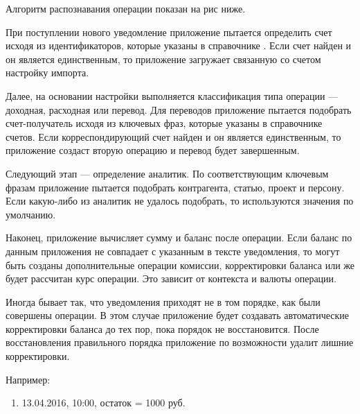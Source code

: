 \documentclass[a4paper,10pt,russian]{sphinxmanual}
\begin{document}
Алгоритм распознавания операции показан на рис ниже.


При поступлении нового уведомление приложение пытается определить счет исходя из идентификаторов,
которые указаны в справочнике . Если счет найден и он является единственным, то приложение
загружает связанную со счетом настройку импорта.

Далее, на основании настройки выполняется классификация типа операции — доходная, расходная или перевод.
Для переводов приложение пытается подобрать счет-получатель исходя из ключевых фраз,
которые указаны в справочнике счетов. Если корреспондирующий счет найден и он является единственным, то
приложение создаст вторую операцию и перевод будет завершенным.

Следующий этап — определение аналитик. По соответствующим ключевым фразам приложение пытается подобрать
контрагента, статью, проект и персону. Если какую-либо из
аналитик не удалось подобрать, то используются значения по умолчанию.

Наконец, приложение вычисляет сумму и баланс после операции. Если баланс по данным приложения не совпадает
с указанным в тексте уведомления, то могут быть созданы дополнительные операции комиссии, корректировки баланса
или же будет рассчитан курс операции. Это зависит от контекста и валюты операции.

Иногда бывает так, что уведомления приходят не в том порядке, как были совершены операции. В этом случае приложение
будет создавать автоматические корректировки баланса до тех пор, пока порядок не восстановится. После восстановления
правильного порядка приложение по возможности удалит лишние корректировки.

Например:
\begin{enumerate}
\def\theenumi{\arabic{enumi}}
\def\labelenumi{\theenumi .}
\makeatletter\def\p@enumii{\p@enumi \theenumi .}\makeatother
\item {} 
13.04.2016, 10:00, остаток = 1000 руб.

\end{enumerate}
\end{document}
